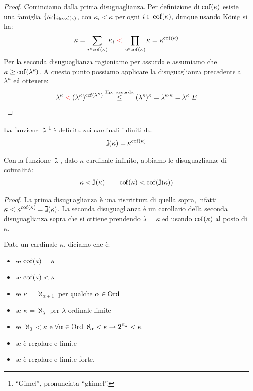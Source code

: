 \begin{proof}
	Cominciamo dalla prima disuguaglianza. Per definizione di $\operatorname{cof}(\kappa)$ esiste una famiglia $\{\kappa_i\}_{i \in \operatorname{cof}(\kappa)}$, con $\kappa_i < \kappa$ per ogni $i \in \operatorname{cof}(\kappa)$, dunque usando König si ha:
	\[ \kappa = \sum_{i \in \operatorname{cof}(\kappa)} \kappa_i \; \textcolor{red}{<} \; \prod_{i \in \operatorname{cof}(\kappa)} \kappa = \kappa^{\operatorname{cof}(\kappa)}
		\]
	Per la seconda disuguaglianza ragioniamo per assurdo e assumiamo che $\kappa \geq \operatorname{cof}(\lambda^\kappa)$. A questo punto possiamo applicare la disuguaglianza precedente a $\lambda^\kappa$ ed ottenere:
	\[ \lambda^\kappa \;\textcolor{red}{<}\; (\lambda^\kappa)^{\cof(\lambda^\kappa)} \overset{\text{Hp. assurda}}{\leq} (\lambda^{\kappa})^{\kappa} = \lambda^{\kappa \cdot \kappa} = \lambda^{\kappa} \;\lightning
		\]
\end{proof}

\begin{definition}
	La funzione $\gimel$\footnote{\;``Gimel'', pronunciata ``ghimel''.} \`e definita sui cardinali infiniti da:
	\[ \gimel(\kappa) = \kappa^{\operatorname{cof}(\kappa)}
		\]
\end{definition}

\begin{corollary}
	Con la funzione $\gimel$, dato $\kappa$ cardinale infinito, abbiamo le disuguaglianze di cofinalit\`a:
	\[ \kappa < \gimel(\kappa) \qquad \operatorname{cof}(\kappa) < \operatorname{cof}(\gimel(\kappa))
		\]
\end{corollary}

\begin{proof}
	La prima disuguaglianza \`e una riscrittura di quella sopra, infatti $\kappa < \kappa^{\operatorname{cof}(\kappa)} = \gimel(\kappa)$. La seconda disuguaglianza \`e un corollario della seconda disuguaglianza sopra che
	si ottiene prendendo $\lambda = \kappa$ ed usando $\operatorname{cof}(\kappa)$ al posto di $\kappa$.
\end{proof}

\begin{definition}
	Dato un cardinale $\kappa$, diciamo che \`e:
	\begin{itemize}
		\item {} se $\operatorname{cof}(\kappa) = \kappa$
		\item {} se $\operatorname{cof}(\kappa) < \kappa$
		\item {} se $\kappa = \aleph_{\alpha + 1}$ per qualche $\alpha \in \operatorname{Ord}$
		\item {} se $\kappa = \aleph_{\lambda}$ per $\lambda$ ordinale limite
		\item {} se $\aleph_0 < \kappa$ e $\forall \alpha \in \operatorname{Ord} \; \aleph_\alpha < \kappa \rightarrow 2^{\aleph_\alpha} < \kappa$
		\item {} se \`e regolare e limite
		\item {} se \`e regolare e limite forte.
	\end{itemize}
\end{definition}


